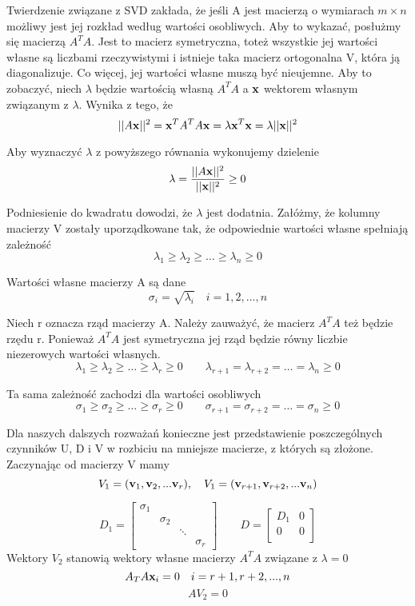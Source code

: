 \documentclass[12pt]{article}
\begin{document}
Twierdzenie związane z SVD zakłada, że jeśli A jest macierzą o wymiarach $m \times n$ możliwy jest jej rozkład według wartości osobliwych. Aby to wykazać, posłużmy się macierzą $A^T A$. Jest to macierz symetryczna, toteż wszystkie jej wartości własne są liczbami rzeczywistymi i istnieje taka macierz ortogonalna V, która ją diagonalizuje. Co więcej, jej wartości własne muszą być nieujemne. Aby to zobaczyć, niech $\lambda$ będzie wartością własną $A^T A$ a $\vb{x}$ wektorem własnym związanym z $\lambda$. Wynika z tego, że
\[||A \vb{x}||^2 = \vb{x}^{T}A^T A\vb{x} = \lambda\vb{x}^T \vb{x} = \lambda||\vb{x}||^2 \]

Aby wyznaczyć $\lambda$ z powyższego równania wykonujemy dzielenie
\[\lambda = \frac{||A\vb{x}||^2}{||\vb{x}||^2} \geq 0 \]

Podniesienie do kwadratu dowodzi, że $\lambda$ jest dodatnia. Załóżmy, że kolumny macierzy V zostały uporządkowane tak, że odpowiednie wartości własne spełniają zależność
\[\lambda_1 \geq \lambda_2 \geq \ldots \geq \lambda_n \geq 0 \]

Wartości własne macierzy A są dane
\[\sigma_i = \sqrt{\lambda_i} \quad i = 1, 2,..., n \]

Niech r oznacza rząd macierzy A. Należy zauważyć, że macierz $A^T A$ też będzie rzędu r. Ponieważ $A^T A$ jest symetryczna jej rząd będzie równy liczbie niezerowych wartości własnych.
\[\lambda_1 \geq \lambda_2 \geq \ldots \geq \lambda_r \geq 0 \qquad \lambda_{r+1} = \lambda_{r+2} = \ldots = \lambda_n \geq 0 \]

Ta sama zależność zachodzi dla wartości osobliwych
\[\sigma_1 \geq \sigma_2 \geq \ldots \geq \sigma_r \geq 0 \qquad \sigma_{r+1} = \sigma_{r+2} = \ldots = \sigma_n \geq 0 \]

Dla naszych dalszych rozważań konieczne jest przedstawienie poszczególnych czynników U, D i V  w rozbiciu na mniejsze macierze, z których są złożone. Zaczynając od macierzy V mamy
\[V_1 = (\vb{v}_1, \vb{v}_2,... \vb{v}_r), \quad V_1 = (\vb{v}_{r+1}, \vb{v}_{r+2},... \vb{v}_n) \]

\[
D_1 = \begin{bmatrix}
\sigma_1 & & & \\
& \sigma_2 & & \\
& & \ddots & \\
& & & \sigma_r
\end{bmatrix}
\qquad
D = \begin{bmatrix}
D_1 & 0 \\
0 & 0 \\
\end{bmatrix}
\]
Wektory $V_2$ stanowią wektory własne macierzy $A^T A$ związane z $\lambda = 0$
\[A_T A \vb{x}_i = 0 \quad i = r+1, r+2,..., n \]
\[AV_2 = 0 \]
\end{document}
